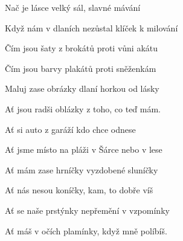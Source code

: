 \zs

Nač je lásce velký sál, slavné mávání

Když nám v dlaních nezůstal klíček k milování

Čím jsou šaty z brokátů proti vůni akátu

Čím jsou barvy plakátů proti sněženkám

\bigskip

Maluj zase obrázky dlaní horkou od lásky

Ať jsou radši oblázky z toho, co teď mám.
\ks



\zr
Ať si auto z garáží kdo chce odnese

Ať jsme místo na pláži v Šárce nebo v lese

Ať mám zase hrníčky vyzdobené sluníčky

Ať nás nesou koníčky, kam, to dobře víš

\bigskip


Ať se naše prstýnky nepřemění v vzpomínky

Ať máš v očích plamínky, když mně políbíš.
\kr
\kp


